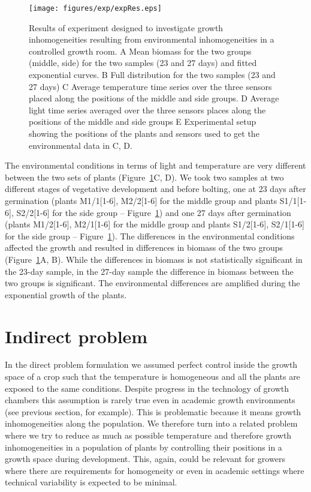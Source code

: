 \documentclass[phd]{infthesis}
\begin{document}
\begin{figure}
\centering
\texttt{[image: figures/exp/expRes.eps]}
\caption{
  Results of experiment designed to investigate growth inhomogeneities resulting
  from environmental inhomogeneities in a controlled growth room. A Mean biomass
  for the two groups (middle, side) for the two samples (23 and 27 days) and
  fitted exponential curves. B Full distribution for the two samples (23 and 27
  days) C Average temperature time series over the three sensors placed along
  the positions of the middle and side groups. D Average light time series
  averaged over the three sensors places along the positions of the middle and
  side groups E Experimental setup showing the positions of the plants and
  sensors used to get the environmental data in C, D.
}
\label{fig:expRes}
\end{figure}

The environmental conditions in terms of light and temperature are very
different between the two sets of plants (Figure~\ref{fig:expRes}C, D). We took
two samples at two different stages of vegetative development and before
bolting, one at 23 days after germination (plants M1/1[1-6], M2/2[1-6] for the
middle group and plants S1/1[1-6], S2/2[1-6] for the side group --
Figure~\ref{fig:expRes}) and one 27 days after germination (plants M1/2[1-6],
M2/1[1-6] for the middle group and plants S1/2[1-6], S2/1[1-6] for the side
group -- Figure~\ref{fig:expRes}). The differences in the environmental
conditions affected the growth and resulted in differences in biomass of the two
groups (Figure~\ref{fig:expRes}A, B). While the differences in biomass is not
statistically significant in the 23-day sample, in the 27-day sample the
difference in biomass between the two groups is significant. The environmental
differences are amplified during the exponential growth of the plants.


\section{Indirect problem}
In the direct problem formulation we assumed perfect control inside the growth
space of a crop such that the temperature is homogeneous and all the plants are
exposed to the same conditions. Despite progress in the technology of growth
chambers this assumption is rarely true even in academic growth environments
(see previous section, for example). This is problematic because it means growth
inhomogeneities along the population. We therefore turn into a related problem
where we try to reduce as much as possible temperature and therefore growth
inhomogeneities in a population of plants by controlling their positions in a
growth space during development. This, again, could be relevant for growers
where there are requirements for homogeneity or even in academic settings where
technical variability is expected to be minimal.
\end{document}
